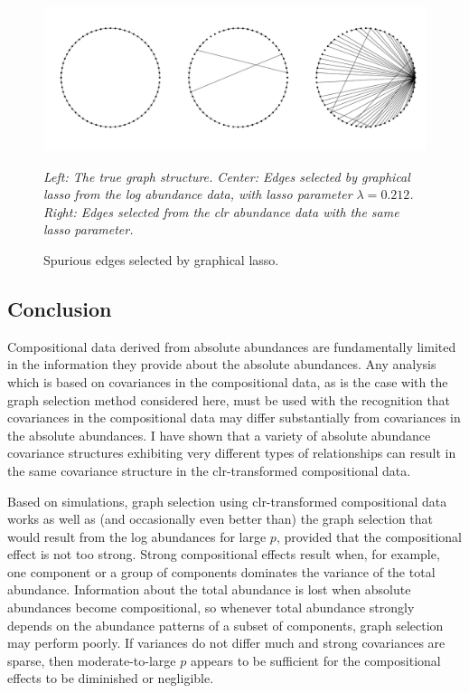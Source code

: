 \documentclass[12pt]{article}
\begin{document}
\begin{figure}
\caption{Spurious edges selected by graphical lasso.}
\label{f:spurious}
\begin{center}
\includegraphics[width=6.5in]{figs/var-dom-band.pdf}
\begin{small}
\textit{Left: The true graph structure. Center: Edges selected by graphical lasso from the log abundance data, with lasso parameter $\lambda = 0.212$. Right: Edges selected from the clr abundance data with the same lasso parameter.}
\end{small}
\end{center}
\end{figure}

\subsection*{Conclusion}

Compositional data derived from absolute abundances are fundamentally limited in the information they provide about the absolute abundances. Any analysis which is based on covariances in the compositional data, as is the case with the graph selection method considered here, must be used with the recognition that covariances in the compositional data may differ substantially from covariances in the absolute abundances. I have shown that a variety of absolute abundance covariance structures exhibiting very different types of relationships can result in the same covariance structure in the clr-transformed compositional data.

Based on simulations, graph selection using clr-transformed compositional data works as well as (and occasionally even better than) the graph selection that would result from the log abundances for large $p$, provided that the compositional effect is not too strong. Strong compositional effects result when, for example, one component or a group of components dominates the variance of the total abundance. Information about the total abundance is lost when absolute abundances become compositional, so whenever total abundance strongly depends on the abundance patterns of a subset of components, graph selection may perform poorly. If variances do not differ much and strong covariances are sparse, then moderate-to-large $p$ appears to be sufficient for the compositional effects to be diminished or negligible.

\pagebreak


\end{document}
